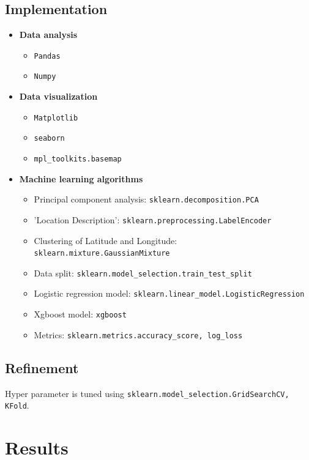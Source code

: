 \documentclass[12pt]{article}
\begin{document}
\subsection{Implementation}
\begin{itemize}
\item{\bf Data analysis} 
	\begin{itemize}
	\item \verb|Pandas|
	\item \verb|Numpy|
	\end{itemize}
\item{\bf Data visualization} 
	\begin{itemize}
	\item \verb|Matplotlib|
	\item \verb|seaborn|
	\item \verb|mpl_toolkits.basemap|
	\end{itemize}
\item{\bf Machine learning algorithms} 
	\begin{itemize}
	\item Principal component analysis: \verb|sklearn.decomposition.PCA|
	\item 'Location Description': \verb|sklearn.preprocessing.LabelEncoder|
	\item Clustering of Latitude and Longitude: \verb|sklearn.mixture.GaussianMixture |
	\item Data split: \verb|sklearn.model_selection.train_test_split|
	\item Logistic regression model: \verb|sklearn.linear_model.LogisticRegression|
	\item Xgboost model: \verb|xgboost|
	\item Metrics: \verb|sklearn.metrics.accuracy_score, log_loss|
	\end{itemize}
\end{itemize}

\subsection{Refinement}
Hyper parameter is tuned using \verb|sklearn.model_selection.GridSearchCV, KFold|.

\section{Results}
\end{document}
